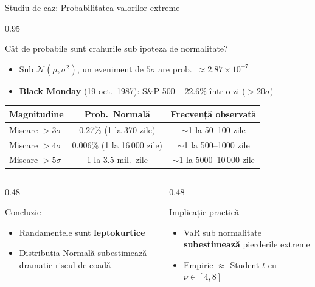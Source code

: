 \documentclass[9pt, aspectratio=169, t]{beamer}
\begin{document}
\begin{frame}[shrink=5]{Studiu de caz: Probabilitatea valorilor extreme}
    \begin{cminipage}{0.95\textwidth}
    \begin{block}{Cât de probabile sunt crahurile sub ipoteza de normalitate?}
    \begin{itemize}\setlength{\itemsep}{0pt}
        \item Sub $\mathcal{N}(\mu,\sigma^2)$, un eveniment de $5\sigma$ are prob.\ $\approx 2.87 \times 10^{-7}$
        \item \textbf{Black Monday} (19 oct.\ 1987): S\&P 500 $-22.6\%$ într-o zi ($> 20\sigma$)
    \end{itemize}
    \end{block}
    \vspace{0.1cm}
    \begin{center}
    {\small
    \renewcommand{\arraystretch}{1.3}
    \begin{tabular}{lcc}
    \toprule
    \textbf{Magnitudine} & \textbf{Prob.\ Normală} & \textbf{Frecvență observată} \\
    \midrule
    Mișcare $> 3\sigma$ & 0.27\% (1 la 370 zile) & $\sim$1 la 50--100 zile \\
    Mișcare $> 4\sigma$ & 0.006\% (1 la 16\,000 zile) & $\sim$1 la 500--1000 zile \\
    Mișcare $> 5\sigma$ & 1 la 3.5 mil.\ zile & $\sim$1 la 5000--10\,000 zile \\
    \bottomrule
    \end{tabular}
    }
    \end{center}
    \vspace{0.1cm}
    \begin{columns}[T]
    \begin{column}{0.48\textwidth}
    \begin{alertblock}{Concluzie}
    \begin{itemize}\setlength{\itemsep}{0pt}
        \item Randamentele sunt \textbf{leptokurtice}
        \item Distribuția Normală subestimează dramatic riscul de coadă
    \end{itemize}
    \end{alertblock}
    \end{column}
    \begin{column}{0.48\textwidth}
    \begin{exampleblock}{Implicație practică}
    \begin{itemize}\setlength{\itemsep}{0pt}
        \item VaR sub normalitate \textbf{subestimează} pierderile extreme
        \item Empiric $\approx$ Student-$t$ cu $\nu \in [4,8]$
    \end{itemize}
    \end{exampleblock}
    \end{column}
    \end{columns}
    \end{cminipage}
\end{frame}
\end{document}
